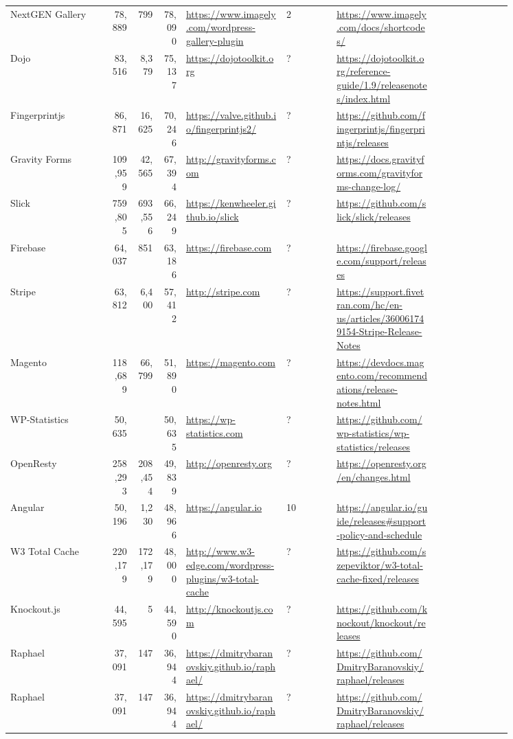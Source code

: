 \begin{longtable}{|p{0.2\linewidth}|r|r|r|p{0.2\linewidth}|p{0.1\linewidth}|p{0.2\linewidth}|p{0.15\linewidth}|}
	NextGEN Gallery &78,889 &799 &78,090 &\url{https://www.imagely.com/wordpress-gallery-plugin} &2 &\url{https://www.imagely.com/docs/shortcodes/} \\
	Dojo &83,516 &8,379 &75,137 &\url{https://dojotoolkit.org} &? &\url{https://dojotoolkit.org/reference-guide/1.9/releasenotes/index.html} \\
	Fingerprintjs &86,871 &16,625 &70,246 &\url{https://valve.github.io/fingerprintjs2/} &? &\url{https://github.com/fingerprintjs/fingerprintjs/releases} \\
	Gravity Forms &109,959 &42,565 &67,394 &\url{http://gravityforms.com} &? &\url{https://docs.gravityforms.com/gravityforms-change-log/} \\
	Slick &759,805 &693,556 &66,249 &\url{https://kenwheeler.github.io/slick} &? &\url{https://github.com/slick/slick/releases} \\
	Firebase &64,037 &851 &63,186 &\url{https://firebase.com} &? &\url{https://firebase.google.com/support/releases} \\
	Stripe &63,812 &6,400 &57,412 &\url{http://stripe.com} &? &\url{https://support.fivetran.com/hc/en-us/articles/360061749154-Stripe-Release-Notes} \\
	Magento &118,689 &66,799 &51,890 &\url{https://magento.com} &? &\url{https://devdocs.magento.com/recommendations/release-notes.html} \\
	WP-Statistics &50,635 & &50,635 &\url{https://wp-statistics.com} &? &\url{https://github.com/wp-statistics/wp-statistics/releases} \\
	OpenResty &258,293 &208,454 &49,839 &\url{http://openresty.org} &? &\url{https://openresty.org/en/changes.html} \\
	Angular &50,196 &1,230 &48,966 &\url{https://angular.io} &10 &\url{https://angular.io/guide/releases\#support-policy-and-schedule}\\
	W3 Total Cache &220,179 &172,179 &48,000 &\url{http://www.w3-edge.com/wordpress-plugins/w3-total-cache} &? &\url{https://github.com/szepeviktor/w3-total-cache-fixed/releases} \\
	Knockout.js &44,595 &5 &44,590 &\url{http://knockoutjs.com} &? &\url{https://github.com/knockout/knockout/releases} \\
	Raphael &37,091 &147 &36,944 &\url{https://dmitrybaranovskiy.github.io/raphael/} &? &\url{https://github.com/DmitryBaranovskiy/raphael/releases} \\
	Raphael &37,091 &147 &36,944 &\url{https://dmitrybaranovskiy.github.io/raphael/} &? &\url{https://github.com/DmitryBaranovskiy/raphael/releases} \\

\end{longtable}
